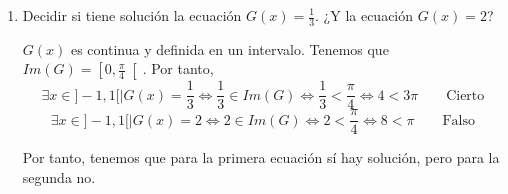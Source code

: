 \documentclass[12pt]{article}
\begin{document}
\begin{ejercicio} 
\begin{enumerate}
        \item Decidir si tiene solución la ecuación $G(x)=\frac{1}{3}$. ¿Y la ecuación $G(x)=2$?

        $G(x)$ es continua y definida en un intervalo. Tenemos que $Im(G)=\left[0,\frac{\pi}{4} \right[$. Por tanto,
        \begin{equation*}
            \exists x\in ]-1,1[\mid G(x)=\frac{1}{3}\Longleftrightarrow \frac{1}{3}\in Im(G) \Longleftrightarrow \frac{1}{3} < \frac{\pi}{4} \Longleftrightarrow 4<3\pi  \qquad \text{Cierto}
        \end{equation*}
        \begin{equation*}
            \exists x\in ]-1,1[\mid G(x)=2\Longleftrightarrow 2\in Im(G) \Longleftrightarrow 2 < \frac{\pi}{4} \Longleftrightarrow 8<\pi \qquad \text{Falso}
        \end{equation*}

        Por tanto, tenemos que para la primera ecuación sí hay solución, pero para la segunda no.
    \end{enumerate}
\end{ejercicio}
    
\end{document}
